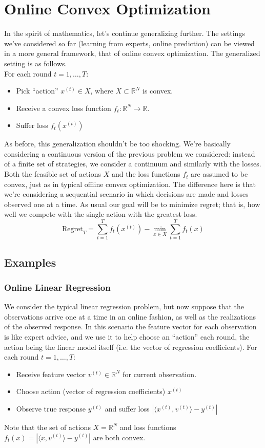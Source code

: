\documentclass[12pt]{article}
\newcommand*{\abs}[1]{\left\lvert#1\right\rvert}
\newcommand{\R}{\mathcal{R}}
\def\R{\mathbb{R}}
\begin{document}
\section{Online Convex Optimization}
In the spirit of mathematics, let's continue generalizing further. The settings we've considered so far (learning from experts, online prediction) can be viewed 
in a more general framework, that of online convex optimization. The generalized setting is as follows. \\
For each round $t = 1, \dots, T$:
\begin{itemize}
\item Pick ``action'' $x^{(t)} \in X$, where $X \subset \R^N$ is convex.
\item Receive a convex loss function $f_t: \R^N \to \R$. 
\item Suffer loss $f_t(x^{(t)})$
\end{itemize}
As before, this generalization shouldn't be too shocking. We're basically considering a continuous version of the previous problem we considered: instead of a finite 
set of strategies, we consider a continuum and similarly with the losses. Both the feasible set of actions $X$ and the loss functions $f_t$ are assumed to be convex, just 
as in typical offline convex optimization. The difference here is that we're considering a sequential scenario in which decisions are made and losses observed one at a time. 
As usual our goal will be to minimize regret; that is, how well we compete with the single action with the greatest loss. 
\[\text{Regret}_T = \sum_{t = 1}^{T} f_t(x^{(t)}) - \min_{x \in X} \sum_{t = 1}^{T} f_t(x)\]

\subsection{Examples}

\subsubsection{Online Linear Regression}
We consider the typical linear regression problem, but now suppose that the observations arrive one at a time in an online fashion, as well as the realizations of the observed response. 
In this scenario the feature vector for each observation is like expert advice, and we use it to help choose an ``action'' each round, the action being the linear model itself (i.e. the vector 
of regression coefficients). 
For each round $t = 1, \dots, T$:
\begin{itemize}
\item Receive feature vector $v^{(t)} \in \R^N$ for current observation.
\item Choose action (vector of regression coefficients) $x^{(t)}$
\item Observe true response $y^{(t)}$ and suffer loss $\abs{\langle x^{(t)}, v^{(t)} \rangle - y^{(t)}}$
\end{itemize}
Note that the set of actions $X = \R^N$ and loss functions $f_t(x) = \abs{\langle x, v^{(t)} \rangle - y^{(t)}}$ are both convex. 
\end{document}
